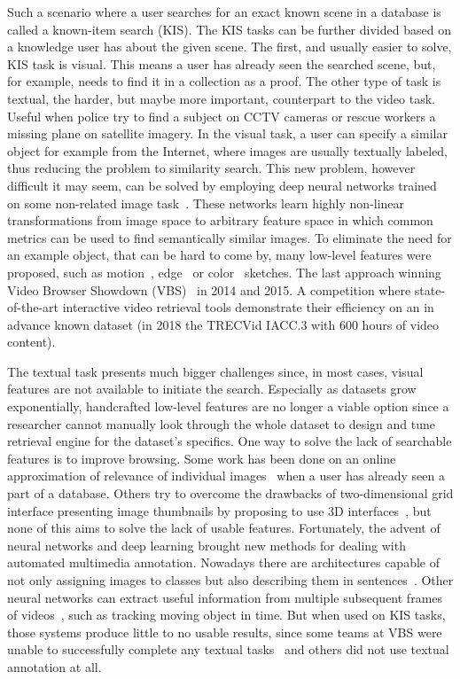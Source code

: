 Such a scenario where a user searches for an exact known scene in a database is called a known-item search (KIS). The KIS tasks can be further divided based on a knowledge user has about the given scene. The first, and usually easier to solve, KIS task is visual. This means a user has already seen the searched scene, but, for example, needs to find it in a collection as a proof. The other type of task is textual, the harder, but maybe more important, counterpart to the video task. Useful when police try to find a subject on CCTV cameras or rescue workers a missing plane on satellite imagery. In the visual task, a user can specify a similar object for example from the Internet, where images are usually textually labeled, thus reducing the problem to similarity search. This new problem, however difficult it may seem, can be solved by employing deep neural networks trained on some non-related image task~\cite{deepFeatures}. These networks learn highly non-linear transformations from image space to arbitrary feature space in which common metrics can be used to find semantically similar images.
To eliminate the need for an example object, that can be hard to come by, many low-level features were proposed, such as motion~\cite{motionSketch}, edge~\cite{ITEC2} or color~\cite{sigBrowser} sketches. The last approach winning Video Browser Showdown (VBS)~\cite{cobarzan2017interactive} in 2014 and 2015. A competition where state-of-the-art interactive video retrieval tools demonstrate their efficiency on an in advance known dataset (in 2018 the TRECVid IACC.3 with 600 hours of video content).

The textual task presents much bigger challenges since, in most cases, visual features are not available to initiate the search. Especially as datasets grow exponentially, handcrafted low-level features are no longer a viable option since a researcher cannot manually look through the whole dataset to design and tune retrieval engine for the dataset's specifics. One way to solve the lack of searchable features is to improve browsing. Some work has been done on an online approximation of relevance of individual images~\cite{suditu2011heat} when a user has already seen a part of a database. Others try to overcome the drawbacks of two-dimensional grid interface presenting image thumbnails by proposing to use 3D interfaces~\cite{schoeffmann20143}, but none of this aims to solve the lack of usable features. Fortunately, the advent of neural networks and deep learning brought new methods for dealing with automated multimedia annotation. Nowadays there are architectures capable of not only assigning images to classes but also describing them in sentences~\cite{vinyals2017show}. Other neural networks can extract useful information from multiple subsequent frames of videos~\cite{bertinetto2016fully}, such as tracking moving object in time. But when used on KIS tasks, those systems produce little to no usable results, since some teams at VBS were unable to successfully complete any textual tasks~\cite{Lokoc-influential-trends} and others did not use textual annotation at all.

